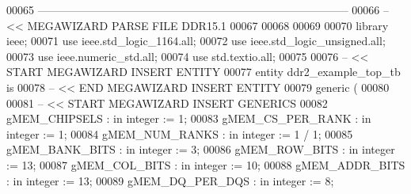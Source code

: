 \begin{DoxyCode}
00065 \textcolor{keyword}{------------------------------------------------------------------------------------}
00066 \textcolor{keyword}{-- << MEGAWIZARD PARSE FILE DDR15.1}
00067 
00068 
00069 
00070 \textcolor{vhdlkeyword}{library }\textcolor{keywordflow}{ieee};
00071 \textcolor{vhdlkeyword}{use }ieee.std\_logic\_1164.\textcolor{keywordflow}{all};
00072 \textcolor{vhdlkeyword}{use }ieee.std\_logic\_unsigned.\textcolor{keywordflow}{all};
00073 \textcolor{vhdlkeyword}{use }ieee.numeric\_std.\textcolor{keywordflow}{all};
00074 \textcolor{vhdlkeyword}{use }std.textio.\textcolor{keywordflow}{all};
00075 
00076 \textcolor{keyword}{-- << START MEGAWIZARD INSERT ENTITY}
00077 \textcolor{keywordflow}{entity }ddr2_example_top_tb \textcolor{keywordflow}{is}
00078 \textcolor{keyword}{-- << END MEGAWIZARD INSERT ENTITY}
00079     \textcolor{keywordflow}{generic} \textcolor{vhdlchar}{(}
00080 
00081 \textcolor{keyword}{-- << START MEGAWIZARD INSERT GENERICS}
00082         \textcolor{vhdlchar}{gMEM_CHIPSELS}          \textcolor{vhdlchar}{:} \textcolor{keywordflow}{in} \textcolor{comment}{integer} \textcolor{vhdlchar}{:=} \textcolor{vhdllogic}{}\textcolor{vhdllogic}{1};
00083         \textcolor{vhdlchar}{gMEM_CS_PER_RANK}       \textcolor{vhdlchar}{:} \textcolor{keywordflow}{in} \textcolor{comment}{integer} \textcolor{vhdlchar}{:=} \textcolor{vhdllogic}{}\textcolor{vhdllogic}{1};
00084         \textcolor{vhdlchar}{gMEM_NUM_RANKS}         \textcolor{vhdlchar}{:} \textcolor{keywordflow}{in} \textcolor{comment}{integer} \textcolor{vhdlchar}{:=} \textcolor{vhdllogic}{}\textcolor{vhdllogic}{1} \textcolor{vhdlchar}{/} \textcolor{vhdllogic}{}\textcolor{vhdllogic}{1};
00085         \textcolor{vhdlchar}{gMEM_BANK_BITS}         \textcolor{vhdlchar}{:} \textcolor{keywordflow}{in} \textcolor{comment}{integer} \textcolor{vhdlchar}{:=} \textcolor{vhdllogic}{}\textcolor{vhdllogic}{3};
00086         \textcolor{vhdlchar}{gMEM_ROW_BITS}          \textcolor{vhdlchar}{:} \textcolor{keywordflow}{in} \textcolor{comment}{integer} \textcolor{vhdlchar}{:=} \textcolor{vhdllogic}{}\textcolor{vhdllogic}{13};
00087         \textcolor{vhdlchar}{gMEM_COL_BITS}          \textcolor{vhdlchar}{:} \textcolor{keywordflow}{in} \textcolor{comment}{integer} \textcolor{vhdlchar}{:=} \textcolor{vhdllogic}{}\textcolor{vhdllogic}{10};
00088         \textcolor{vhdlchar}{gMEM_ADDR_BITS}         \textcolor{vhdlchar}{:} \textcolor{keywordflow}{in} \textcolor{comment}{integer} \textcolor{vhdlchar}{:=} \textcolor{vhdllogic}{}\textcolor{vhdllogic}{13};
00089         \textcolor{vhdlchar}{gMEM_DQ_PER_DQS}        \textcolor{vhdlchar}{:} \textcolor{keywordflow}{in} \textcolor{comment}{integer} \textcolor{vhdlchar}{:=} \textcolor{vhdllogic}{}\textcolor{vhdllogic}{8};

\end{DoxyCode}

